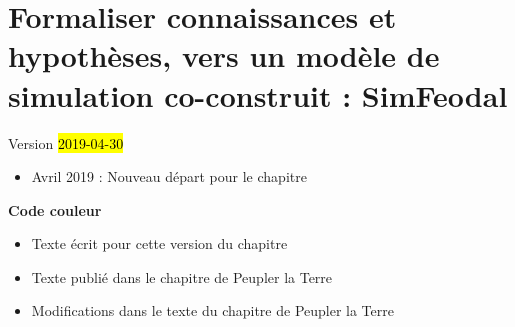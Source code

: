 \chapter{Formaliser connaissances et hypothèses, vers un modèle de simulation co-construit : SimFeodal}
\label{chap:chap2}
\begin{center}
	{\large Version \hl{2019-04-30}}
\end{center}

\begin{itemize}
	\item Avril 2019 : Nouveau départ pour le chapitre
\end{itemize}
\setcounter{minitocdepth}{1}

	\minitoc


\textbf{Code couleur}
\begin{itemize}
	\item Texte écrit pour cette version du chapitre
	\item {\redroman Texte publié dans le chapitre de Peupler la Terre}
	\item {\blueroman Modifications dans le texte du chapitre de Peupler la Terre}
\end{itemize}

\clearpage


